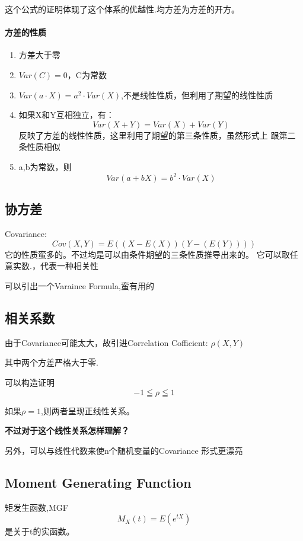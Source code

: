 \documentclass[12pt,a4paper]{ctexart}
\begin{document}
这个公式的证明体现了这个体系的优越性.均方差为方差的开方。

\paragraph{方差的性质}
\begin{enumerate}
	\item 方差大于零
	\item $ Var \left(C\right) =0$，C为常数
	\item $ Var \left(a \cdot X\right) =a^2 \cdot Var \left(X\right)$,不是线性性质，但利用了期望的线性性质
	\item 如果X和Y互相独立，有：
	\[ Var \left(X+Y\right) =Var \left(X\right)+Var \left(Y\right)\]
	反映了方差的线性性质，这里利用了期望的第三条性质，虽然形式上
	跟第二条性质相似
	\item a,b为常数，则
	\[ Var \left(a+bX\right)=b^2 \cdot Var \left(X\right) \]
\end{enumerate}

\subsection{协方差}
Covariance:
\[ Cov \left(X,Y\right) =E \left(\left(X-E \left(X\right)\right)
\left(Y-\left(E \left(Y\right)\right)\right) \right)\]
它的性质蛮多的。不过均是可以由条件期望的三条性质推导出来的。
它可以取任意实数.，代表一种相关性

可以引出一个Varaince Formula,蛮有用的

\subsection{相关系数}
由于Covariance可能太大，故引进Correlation Cofficient: $ \rho 
\left(X,Y\right) $

其中两个方差严格大于零.

可以构造证明\[ -1 \leqq \rho \leqq 1 \]

如果$ \rho =1 $,则两者呈现正线性关系。

\textbf{不过对于这个线性关系怎样理解？}

另外，可以与线性代数来使n个随机变量的Covariance 形式更漂亮

\subsection{Moment Generating Function}
矩发生函数,MGF
\[ M_X \left(t\right)=E \left(e ^{tX}\right) \]
是关于t的实函数。
\end{document}

